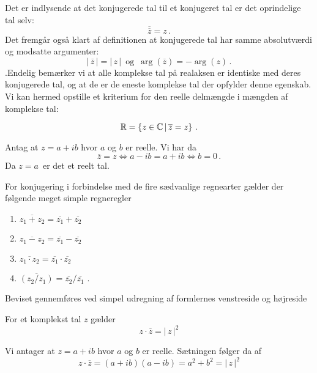 Det er indlysende at det konjugerede tal til et konjugeret tal er det oprindelige tal selv: 
\begin{equation}
\overline{\overline z}=z\,.
\end{equation}
Det fremgår også klart af definitionen at  konjugerede tal har samme absolutværdi og modsatte argumenter:
\begin{equation}
|\,\overline z\,|=|\,z\,|\,\,\,\mathrm{og}
\,\,\,\arg(\overline z)=-\arg(z)\,.
\end{equation}
.\bs Endelig bemærker vi at alle komplekse tal på realaksen er identiske med deres konjugerede tal, og at de er de eneste komplekse tal der opfylder denne egenskab. Vi kan hermed opstille et kriterium for den reelle delmængde i mængden af komplekse tal:\bs
\begin{theorem}[Realkriteriet]\label{tn29_reeltKriterium}
$$\mathbb{R}=\left\{z\in \mathbb C\,|\,\overline z=z\right\}\,.$$
\end{theorem}
\begin{bevis}
Antag at $z=a+ib$ hvor $a$ og $b$ er reelle. Vi har da 
$$\overline z =z \Leftrightarrow a-ib=a+ib \Leftrightarrow b=0\,.$$
Da $z=a\,$ er det et reelt tal. 
\end{bevis}
For konjugering i forbindelse med de fire sædvanlige regnearter gælder der følgende meget simple regneregler\bs
\begin{theorem}
\begin{enumerate}
\item $\overline{z_1+z_2}=\overline{z_1}+\overline{z_2}$
\item $\overline{z_1-z_2}=\overline{z_1}-\overline{z_2}$
\item $\overline{z_1\cdot z_2}=\overline{z_1}\cdot\overline{z_2}$
\item $\overline{(z_2/z_1)}=\overline{z_2}/\overline{z_1}\,\,.$
\end{enumerate}

\end{theorem}
\begin{bevis}
Beviset gennemføres ved simpel udregning af formlernes venstreside og højreside
\end{bevis}

\begin{theorem}
For et komplekst tal $z$ gælder
\begin{equation}
z\cdot \overline z =|\,z\,|^2
\end{equation}
\end{theorem}
\begin{bevis}
Vi antager at $z=a+ib$ hvor $a$ og $b$ er reelle. Sætningen følger da af
$$
z\cdot \overline z = (a+ib)(a-ib)=a^2+b^2=|\,z\,|^2$$
\end{bevis}

